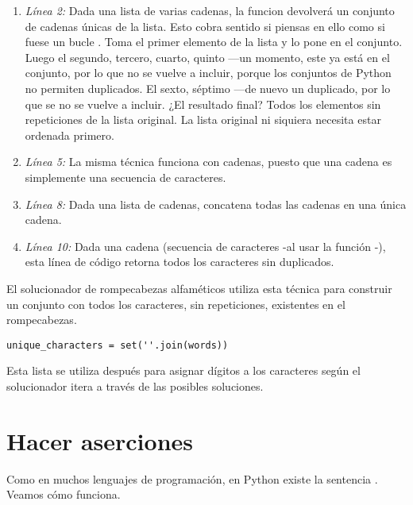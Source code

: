 \begin{enumerate}

\item \emph{Línea 2:} Dada una lista de varias cadenas, la funcion  devolverá un conjunto de cadenas únicas de la lista. Esto cobra sentido si piensas en ello como si fuese un bucle . Toma el primer elemento de la lista y lo pone en el conjunto. Luego el segundo, tercero, cuarto, quinto ---un momento, este ya está en el conjunto, por lo que no se vuelve a incluir, porque los conjuntos de Python no permiten duplicados. El sexto, séptimo ---de nuevo un duplicado, por lo que se no se vuelve a incluir. ¿El resultado final? Todos los elementos sin repeticiones de la lista original. La lista original ni siquiera necesita estar ordenada primero.

\item \emph{Línea 5:} La misma técnica funciona con cadenas, puesto que una cadena es simplemente una secuencia de caracteres.

\item \emph{Línea 8:} Dada una lista de cadenas,  concatena todas las cadenas en una única cadena.

\item \emph{Línea 10:} Dada una cadena (secuencia de caracteres -al usar la función -), esta línea de código retorna todos los caracteres sin duplicados.

\end{enumerate}

El solucionador de rompecabezas alfaméticos utiliza esta técnica para construir un conjunto con todos los caracteres, sin repeticiones, existentes en el rompecabezas.

\noindent\begin{minipage}{\textwidth}
\begin{lstlisting}[mathescape=True]
unique_characters = set(''.join(words))
\end{lstlisting}
\end{minipage}

Esta lista se utiliza después para asignar dígitos a los caracteres según el solucionador itera a través de las posibles soluciones.

\section{Hacer aserciones}

Como en muchos lenguajes de programación, en Python existe la sentencia . Veamos cómo funciona.

